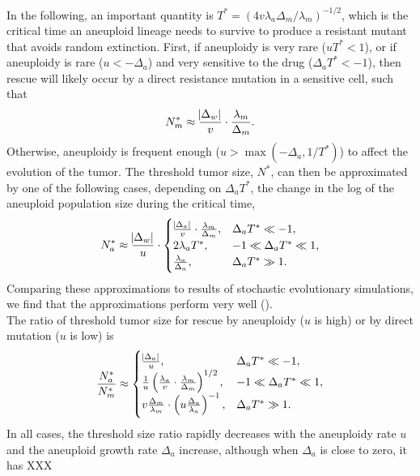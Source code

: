 \documentclass[12pt]{extarticle}
\begin{document}
In the following, an important quantity is $T^* = (4 v \lambda_a \Delta_m/\lambda_m)^{-1/2}$, which is the critical time an aneuploid lineage needs to survive to produce a resistant mutant that avoids random extinction.
First, if aneuploidy is very rare ($u T^*< 1$), or if aneuploidy is rare ($u < -\Delta_a$) and very sensitive to the drug ($\Delta_a T^* < -1$), then rescue will likely occur by a direct resistance mutation in a sensitive cell, such that 
\begin{equation}
N_m^* \approx \frac{\abs{\Delta_w}}{v} \cdot \frac{\lambda_m}{\Delta_m} .
\end{equation}
Otherwise, aneuploidy is frequent enough ($u > \max{(-\Delta_a, 1/T^*)}$) to affect the evolution of the tumor. 
The threshold tumor size, $N^*$, can then be approximated by one of the following cases, depending on $\Delta_a T^*$, the change in the log of the aneuploid population size during the critical time,
\begin{equation}\label{rescue_prob_approx}
\begin{aligned}
N_a^* \approx 
  \frac{\abs{\Delta_w}}{u} \cdot \begin{cases}
    \frac{\abs{\Delta_a}}{v} \cdot \frac{\lambda_m}{\Delta_m} ,&
  \Delta_a T^* \ll -1 ,\\ 
  2\lambda_a T^* ,&
  -1 \ll \Delta_a T^* \ll 1  ,\\ 
  \frac{\lambda_a}{\Delta_a} ,&
   \Delta_a T^* \gg 1 .
  \end{cases}
\end{aligned}
\end{equation}
Comparing these approximations to results of stochastic evolutionary simulations, we find that the approximations perform very well ().
\\

The ratio of threshold tumor size for rescue by aneuploidy ($u$ is high) or by direct mutation ($u$ is low) is
\begin{equation}
\frac{N^*_a}{N^*_m} \approx \begin{cases}
    \frac{\abs{\Delta_a}}{u} ,&
  \Delta_a T^* \ll -1 ,\\ 
  \frac{1}{u}\left(\frac{\lambda_a}{v} \cdot \frac{\lambda_m}{\Delta_m}\right)^{1/2} ,&
  -1 \ll \Delta_a T^* \ll 1  ,\\ 
  v \frac{\Delta_m}{\lambda_m} \cdot \left(u \frac{\Delta_a}{\lambda_a}\right)^{-1}  ,&
   \Delta_a T^* \gg 1 .
  \end{cases}
\end{equation}
In all cases, the threshold size ratio rapidly decreases with the aneuploidy rate $u$ and the aneuploid growth rate $\Delta_a$ increase, although when $\Delta_a$ is close to zero, it has XXX
\end{document}
